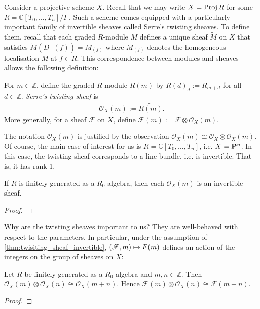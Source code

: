\documentclass[12pt]{ociamthesis}  %
\begin{document}
Consider a projective scheme $X$. Recall that we may write
$X=\operatorname{Proj} R$ for some $R=\mathbb{C}[T_0,\ldots,T_n]/I$ \cite[II Corollary 5.16]{hartshorne1977}. Such a scheme comes
equipped with a particularly important family of invertible sheaves
called Serre's twisting sheaves. To define them, recall that each
graded $R$-module $M$ defines a unique sheaf $\tilde M$ on $X$
that satisfies $\tilde M (D_+(f)) = M_{(f)}$ where $M_{(f)}$
denotes the homogeneous localisation $M$ at $f\in R$. This
correspondence between modules and sheaves allows the following
definition:

\begin{definition}
  For $m\in\mathbb{Z}$, define the graded $R$-module $R(m)$ by
  $R(d)_d := R_{m+d}$ for all $d\in\mathbb{Z}$. \emph{Serre's
    twisting sheaf} is
  \begin{align*}
    \mathscr O_X(m) := \widetilde{R(m)}.
  \end{align*}
  More generally, for a sheaf $\mathscr F$ on $X$, define
  $\mathscr F(m) := \mathscr F \otimes \mathscr O_X(m)$.
\end{definition}
The notation $\mathscr O_X(m)$ is justified by the observation
$\mathscr O_X(m) \cong \mathscr O_X \otimes \mathscr O_X(m)$.
Of course, the main case of interest for us is
$R=\mathbb{C}[T_0,\ldots,T_n]$, i.e. $X=\mathbf{P}^{n}_{}$.
In this case, the twisting sheaf corresponds to a line bundle,
i.e. is invertible. That is, it has rank 1.

\begin{proposition}
  \label{thm:twisiting_sheaf_invertible}
  If $R$ is finitely generated as a $R_0$-algebra, then each
  $\mathscr O_X(m)$ is an invertible sheaf.
  \begin{proof}
    \missingproof
  \end{proof}
\end{proposition}

Why are the twisting sheaves important to us? They are well-behaved
with respect to the parameters. In particular,
under the assumption of \ref{thm:twisiting_sheaf_invertible},
$(\mathscr F,m)\mapsto \mathscr \mathscr F(m)$ defines an action of
the integers on the group of sheaves on $X$:

\begin{lemma}\label{lem:additivity_twisting_sheaf}
  Let $R$ be finitely generated as a $R_0$-algebra and $m,n\in\mathbb{Z}$.
  Then $\mathscr O_X(m) \otimes \mathscr O_X(n) \cong \mathscr O_X(m + n)$. Hence
  $\mathscr F(m) \otimes \mathscr O_X(n) \cong \mathscr F(m+n)$.
  \begin{proof}
    \missingproof
  \end{proof}
\end{lemma}
\end{document}
